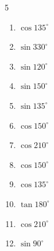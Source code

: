 \begin{multicols}{5}
\begin{enumerate}

  \item $\displaystyle \cos{135^\circ}$


  \item $\displaystyle \sin{330^\circ}$


  \item $\displaystyle \sin{120^\circ}$


  \item $\displaystyle \sin{150^\circ}$


  \item $\displaystyle \sin{135^\circ}$


  \item $\displaystyle \cos{150^\circ}$


  \item $\displaystyle \cos{210^\circ}$


\columnbreak %

  \item $\displaystyle \cos{150^\circ}$


  \item $\displaystyle \cos{135^\circ}$


  \item $\displaystyle \tan{180^\circ}$

        \phantom{$\displaystyle =0$}

  \item $\displaystyle \cos{210^\circ}$


  \item $\displaystyle \sin{90^\circ}$


\end{enumerate}
\end{multicols}
